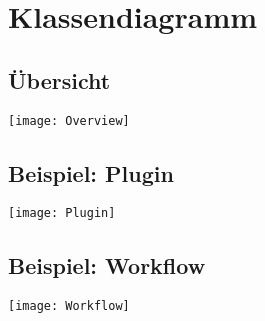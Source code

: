 \section{Klassendiagramm}
\subsection{Übersicht}
\texttt{[image: Overview]}
\subsection{Beispiel: Plugin}
\texttt{[image: Plugin]}
\subsection{Beispiel: Workflow}
\texttt{[image: Workflow]}